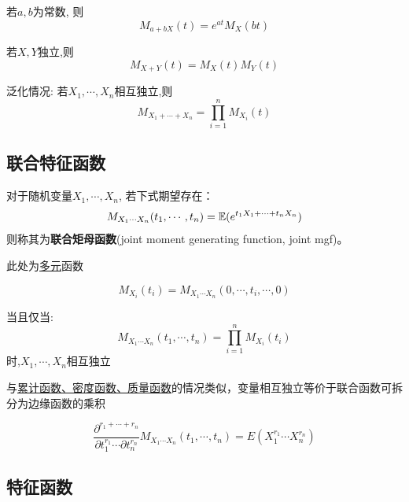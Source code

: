 \begin{proposition}
    若$a,b$为常数, 则
    \[ M_{a+b X}(t) = e^{a t}M_X(b t) \]
\end{proposition}

\begin{theorem}\label{thm:mgf_sum}
    若$X,Y$独立,则
    \[ M_{X+Y}(t) = M_X(t) M_Y(t) \]

    泛化情况: 若$X_1,\cdots, X_n$相互独立,则
    \[ M_{X_1+\cdots+ X_n} = \prod_{i=1}^n M_{X_i}(t)\]
\end{theorem}

\subsection{联合特征函数}

\begin{definition}
    对于随机变量$X_1,\cdots, X_n$, 若下式期望存在：
    \[ M_{X_1\cdots X_n}(t_1,\cdots ,t_n) = \mathbb{E}(e^{t_1 X_1+\cdots + t_n X_n}) \]
    则称其为\textbf{联合矩母函数}(joint moment generating function, joint mgf)。
\end{definition}

\begin{remark}
    此处为\underline{多元}函数
\end{remark}

\begin{proposition}
    \[ M_{X_i}(t_i) = M_{X_1\cdots X_n}(0,\cdots ,t_i,\cdots ,0) \]
\end{proposition}

\begin{theorem}
    当且仅当:
    \[ M_{X_1\cdots X_n}(t_1,\cdots ,t_n) = \prod_{i=1}^n M_{X_i}(t_i) \]
    时,$X_1,\cdots, X_n$相互独立
\end{theorem}

\begin{remark}
    与\underline{累计函数、密度函数、质量函数}的情况类似，变量相互独立等价于联合函数可拆分为边缘函数的乘积
\end{remark}

\begin{theorem}
    \[ \frac{\partial^{r_1+\cdots +r_n} }{\partial t_1^{r_1} \cdots  \partial t_n^{r_n}} M_{X_1\cdots X_n}(t_1,\cdots ,t_n) = E(X_1^{r_1} \cdots X_n^{r_n}) \]
\end{theorem}

\subsection{特征函数}

